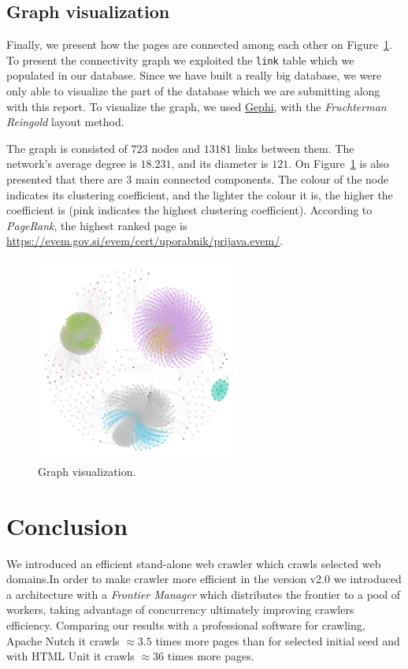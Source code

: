 \documentclass{article}
\begin{document}
\subsection{Graph visualization}

Finally, we present how the pages are connected among each other on Figure~\ref{fig:5}. To present the connectivity graph we exploited the \texttt{link} table which we populated in our database. Since we have built a really big database, we were only able to visualize the part of the database which we are submitting along with this report. To visualize the graph, we used \href{https://gephi.org}{Gephi}, with the \textit{Fruchterman Reingold} layout method.

The graph is consisted of $723$ nodes and $13181$ links between them. The network's average degree is $18.231$, and its diameter is $121$. On Figure~\ref{fig:5} is also presented that there are $3$ main connected components. The colour of the node indicates its clustering coefficient, and the lighter the colour it is, the higher the coefficient is (pink indicates the highest clustering coefficient). According to \textit{PageRank}, the highest ranked page is \url{https://evem.gov.si/evem/cert/uporabnik/prijava.evem/}. 

\begin{figure}
	\centering
	\includegraphics[width=0.6\textwidth]{reduced_graph.png}
	\caption{Graph visualization.}
	\label{fig:5}
\end{figure}

\section{Conclusion}
We introduced an efficient stand-alone web crawler which crawls selected web domains.In order to make crawler more efficient in the version v2.0 we introduced a architecture with a \textit{Frontier Manager} which distributes the frontier to a pool of workers, taking advantage of concurrency ultimately improving crawlers efficiency. Comparing our results with a professional software for crawling, Apache Nutch it crawls $\approx3.5$ times more pages than for selected initial seed and with HTML Unit it crawls  $\approx36$ times more pages.



\end{document}
